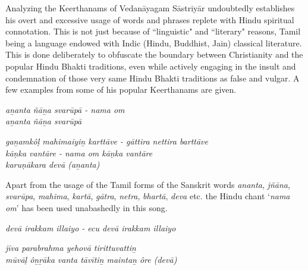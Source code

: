 \newpage

Analyzing the Keerthanams of Vedanāyagam Sāstriyār undoubtedly establishes his overt and excessive usage of words and phrases replete with Hindu spiritual connotation. This is not just because of ``linguistic" and ``literary" reasons, Tamil being a language endowed with Indic (Hindu, Buddhist, Jain) classical literature. This is done deliberately to obfuscate the boundary between Christianity and the popular Hindu Bhakti traditions, even while actively engaging in the insult and condemnation of those very same Hindu Bhakti traditions as false and vulgar. A few examples from some of his popular Keerthanams are given.

\begin{centerquote}
\textit{aṉanta ñāṉa svarūpā - nama om\\ aṉanta ñāṉa svarūpā}
\end{centerquote}

\begin{centerquote}
\textit{gaṉamkôḷ mahimaiyiṉ karttāve - gāttira nettira barttāve \\ kāṇka vantāre - nama om kāṇka vantāre\\ karuṇākara devā (aṉanta) }
\end{centerquote}

\begin{myquote}
\end{myquote}

\begin{myquote}
\end{myquote}

Apart from the usage of the Tamil forms of the Sanskrit words \textit{ananta}, \textit{jñāna}, \textit{svarūpa}, \textit{mahima}, \textit{kartā}, \textit{gātra}, \textit{netra}, \textit{bhartā}, \textit{deva} etc. the Hindu chant `\textit{nama om}' has been used unabashedly in this song.

\begin{centerquote}
\textit{devā irakkam illaiyo - ecu devā irakkam illaiyo}
\end{centerquote}

\begin{centerquote}
\textit{jīva parabrahma yehovā tirittuvattiṉ \\ mūvāḷ ôṉṟāka vanta tāvītiṉ maintaṉ ôre (devā)}
\end{centerquote}

